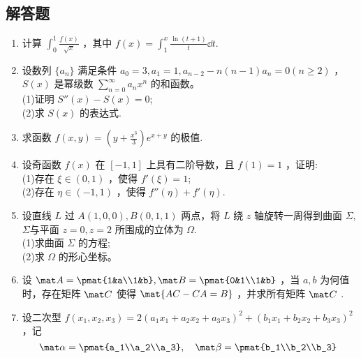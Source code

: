 \subsection{解答题}
\begin{enumerate}
\item 计算 $\displaystyle \int_{0}^{1}\frac{f(x)}{\sqrt{x}}$ ，其中  $\displaystyle f(x)=\int_{1}^{x}\frac{\ln(t+1)}{t}\dd{t}$.
\item 设数列 $\{a_n\}$ 满足条件 $a_0=3,a_1=1,a_{n-2}-n(n-1)a_n=0(n\ge 2)$ ， $S(x)$ 是幂级数 $\displaystyle \sum_{n=0}^\infty a_nx^n$ 的和函数。\\
(1)证明 $S''(x)-S(x)=0$;\\
(2)求 $S(x)$ 的表达式.
\item 求函数 $\displaystyle f(x,y)=(y+\frac{x^3}{3})e^{x+y}$ 的极值.
\item 设奇函数 $f(x)$ 在 $[-1,1]$ 上具有二阶导数，且 $f(1)=1$ ，证明:\\
(1)存在 $\xi \in(0,1)$  ，使得 $f'(\xi)=1$;\\
(2)存在 $\eta \in (-1,1)$ ，使得 $f''(\eta)+f'(\eta)$.
\item 设直线 $L$ 过 $A(1,0,0),B(0,1,1)$ 两点，将 $L$ 绕 $z$ 轴旋转一周得到曲面 $\Sigma$, $\Sigma$与平面 $z=0,z=2$  所围成的立体为 $\Omega$.\\
(1)求曲面 $\Sigma$ 的方程;\\
(2)求 $\Omega$ 的形心坐标。
\item 设 $\mat A=\pmat{1&a\\1&b},\mat B=\pmat{0&1\\1&b}$ ，当 $a,b$ 为何值时，存在矩阵 $\mat C$ 使得 $\mat {AC-CA=B}$ ，并求所有矩阵 $\mat C$  .
\item  设二次型 $f(x_1,x_2,x_3)=2(a_1x_1+a_2x_2+a_3x_3)^2+(b_1x_1+b_2x_2+b_3x_3)^2$  ，记\begin{equation}
\mat \alpha=\pmat{a_1\\a_2\\a_3},\quad
\mat \beta=\pmat{b_1\\b_2\\b_3}~
\end{equation}
\end{enumerate}